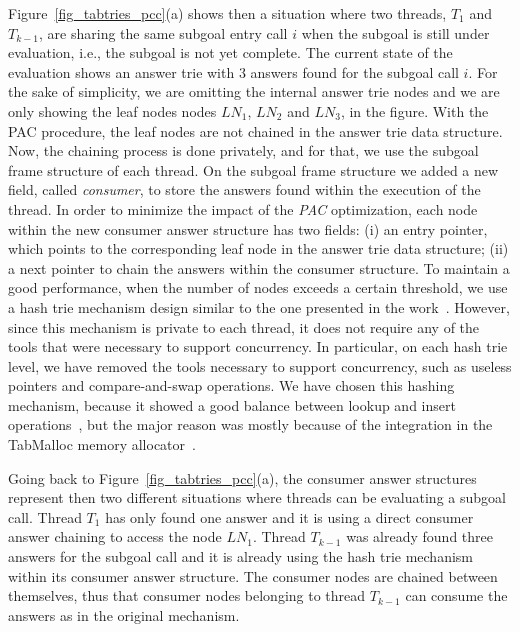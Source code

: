 \documentclass{llncs}
\begin{document}
Figure~\ref{fig_tabtries_pcc}(a) shows then a situation where two
threads, $T_1$ and $T_{k-1}$, are sharing the same subgoal entry call
$i$ when the subgoal is still under evaluation, i.e., the subgoal is
not yet complete. The current state of the evaluation shows an answer
trie with $3$ answers found for the subgoal call $i$. For the sake of
simplicity, we are omitting the internal answer trie nodes and we are
only showing the leaf nodes nodes $LN_1$, $LN_2$ and $LN_3$, in the
figure. With the PAC procedure, the leaf nodes are not chained in the
answer trie data structure. Now, the chaining process is done
privately, and for that, we use the subgoal frame structure of each
thread. On the subgoal frame structure we added a new field, called
\emph{consumer}, to store the answers found within the execution of
the thread. In order to minimize the impact of the \emph{PAC}
optimization, each node within the new consumer answer structure has
two fields: (i) an entry pointer, which points to the corresponding
leaf node in the answer trie data structure; (ii) a next pointer to
chain the answers within the consumer structure. To maintain a good
performance, when the number of nodes exceeds a certain threshold, we
use a hash trie mechanism design similar to the one presented in the
work~\cite{Areias-ijpp15}. However, since this mechanism is private to
each thread, it does not require any of the tools that were necessary
to support concurrency. In particular, on each hash trie level, we
have removed the tools necessary to support concurrency, such as
useless pointers and compare-and-swap operations. We have chosen this
hashing mechanism, because it showed a good balance between lookup and
insert operations~\cite{Areias-ijpp15}, but the major reason was
mostly because of the integration in the TabMalloc memory
allocator~\cite{Areias-12b}.

Going back to Figure~\ref{fig_tabtries_pcc}(a), the consumer answer
structures represent then two different situations where threads can
be evaluating a subgoal call. Thread $T_1$ has only found one answer
and it is using a direct consumer answer chaining to access the node
$LN_1$. Thread $T_{k-1}$ was already found three answers for the
subgoal call and it is already using the hash trie mechanism within
its consumer answer structure. The consumer nodes are chained between
themselves, thus that consumer nodes belonging to thread $T_{k-1}$ can
consume the answers as in the original mechanism.
\end{document}
